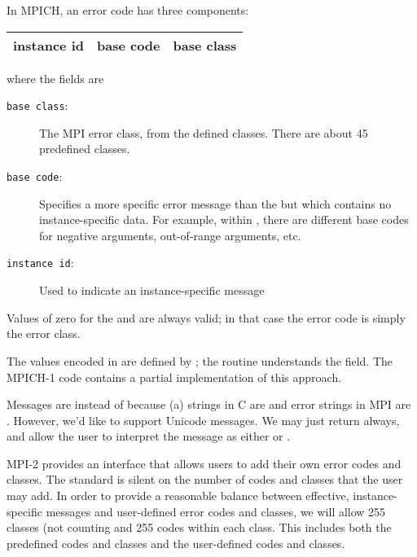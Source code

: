 \documentclass{article}
\begin{document}
In MPICH, an error code has three components:

\begin{center}
\begin{tabular}{|c|c|c|}
\hline
instance id&base code&base class\\
\hline
\end{tabular}
\end{center}
where the fields are
\begin{description}
\item[\texttt{base class}:]The MPI error class, from the defined
classes.  There are about 45 predefined classes.

\item[\texttt{base code}:]Specifies a more specific error message than
the  but which contains no instance-specific data.
For example, within , there are different base codes
for negative arguments, out-of-range arguments, etc.

\item[\texttt{instance id}:]Used to indicate an instance-specific message
\end{description}

Values of zero for the  and  are
always valid; in that case the error code is simply the error class.

The values encoded in  are defined by
; the routine 
understands the  field.  The MPICH-1 code contains a
partial implementation of this approach.

Messages are  instead of  because (a)
strings in C are  and error strings in MPI are .  However, we'd like to support Unicode messages.  We may just
return  always, and allow the user to interpret the
message as either  or .

MPI-2 provides an interface that allows users to add their own error
codes and classes.  The standard is silent on the number of codes and
classes that the user may add.  In order to provide a reasonable
balance between effective, instance-specific messages and user-defined
error codes and classes, we will allow 255 classes (not counting
 and 255
codes within each class.  This includes both the predefined codes and
classes and the user-defined codes and classes.
\end{document}
